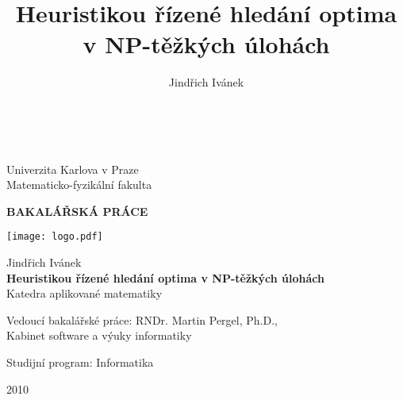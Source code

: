 \documentclass[12pt,notitlepage,fleqn]{report} %
\title{Heuristikou řízené hledání optima v NP-těžkých úlohách}
\author{Jindřich Ivánek}
\theoremstyle{definition}
\begin{document}
\begin{titlepage}
\begin{center}
\ \\

\vspace{15mm}

\large
Univerzita Karlova v Praze\\
Matematicko-fyzikální fakulta\\

\vspace{5mm}

{\Large\bf BAKALÁŘSKÁ PRÁCE}

\vspace{10mm}

\texttt{[image: logo.pdf]} 

\vspace{15mm}

{\Large Jindřich Ivánek}\\
\vspace{5mm}
{\Large\bf Heuristikou řízené hledání optima v NP-těžkých úlohách}\\
\vspace{5mm}
Katedra aplikované matematiky\\ %
\end{center}
\vspace{10mm}

\large
\noindent Vedoucí bakalářské práce: RNDr. Martin Pergel, Ph.D.,\\ %
\hskip20mm Kabinet software a výuky informatiky
\vspace{1mm} 

\noindent Studijní program: Informatika %

\vspace{10mm}

\begin{center}
2010 %
\end{center}

\end{titlepage} %
\end{document}
